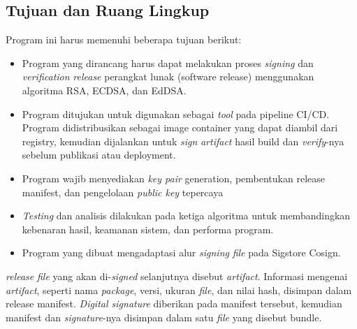 \subsection{Tujuan dan Ruang Lingkup}
Program ini harus memenuhi beberapa tujuan berikut:
\begin{itemize} 
    \item Program yang dirancang harus dapat melakukan proses \textit{signing} dan \textit{verification}
\textit{release} perangkat lunak (software release) menggunakan algoritma RSA, ECDSA, dan EdDSA.
    \item Program ditujukan untuk digunakan sebagai \textit{tool} pada pipeline CI/CD. Program
didistribusikan sebagai image container yang dapat diambil dari registry, kemudian
dijalankan untuk \textit{sign} \textit{artifact} hasil build dan \textit{verify}-nya sebelum
publikasi atau deployment.
    \item Program wajib menyediakan \textit{key pair} generation,
pembentukan release manifest, dan pengelolaan \textit{public key} tepercaya
    \item \textit{Testing} dan analisis dilakukan pada ketiga algoritma untuk membandingkan kebenaran hasil, keamanan
sistem, dan performa program.
    \item Program yang dibuat mengadaptasi alur \textit{signing} \textit{file} pada Sigstore Cosign.
\end{itemize}
\textit{release} \textit{file} yang akan di-\textit{signed} selanjutnya disebut \textit{artifact}. Informasi mengenai
\textit{artifact}, seperti nama \textit{package}, versi, ukuran \textit{file}, dan nilai hash, disimpan dalam release
manifest. \textit{Digital signature} diberikan pada manifest tersebut, kemudian manifest dan
\textit{signature}-nya disimpan dalam satu \textit{file} yang disebut bundle.

